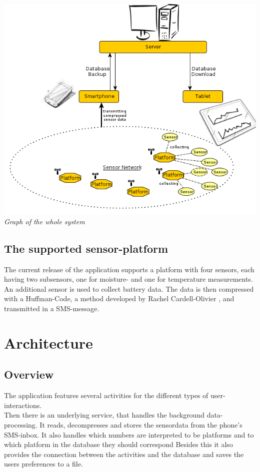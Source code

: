 \documentclass[11pt,oneside,a4paper]{scrartcl}
\begin{document}
\begin{center}
\includegraphics[scale=0.6]{picture/general_buildup.png}\\
\textit{Graph of the whole system}
\end{center}

\subsection{The supported sensor-platform}
The current release of the application supports a platform with four sensors, each having two subsensors, one for moisture- and one for temperature measurements. An additional sensor is used to collect battery data. The data is then compressed with a Huffman-Code, a method developed by Rachel Cardell-Olivier \cite{compression2012}, and transmitted in a SMS-message.


\section{Architecture}
\subsection{Overview}
The application features several activities for the different types of user-interactions. \\
Then there is an underlying service, that handles the background data-processing. It reads, decompresses and stores the sensordata from the phone's SMS-inbox. It also handles which numbers are interpreted to be platforms and to which platform in the database they should correspond Besides this it also provides the connection between the activities and the database and saves the users preferences to a file.
\end{document}
